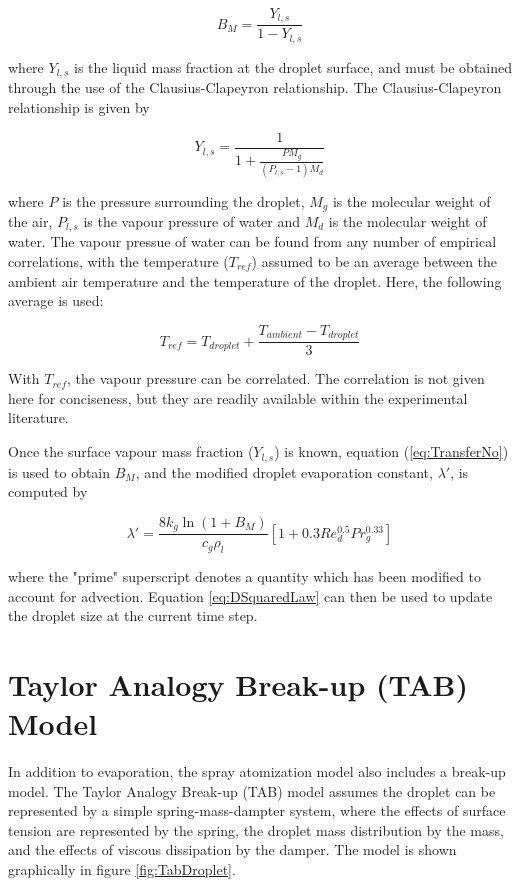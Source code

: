 \documentclass[12pt]{article}
\begin{document}
\begin{equation}\label{eq:TransferNo}
B_{M} = \frac{Y_{l, s}}{1 - Y_{l, s}}
\end{equation}

where $Y_{l, s}$ is the liquid mass fraction at the droplet surface, and must be obtained through the use of the Clausius-Clapeyron relationship. The Clausius-Clapeyron relationship is given by

\begin{equation}
Y_{l, s} = \frac{1}{1 + \frac{PM_{g}}{(P_{l, s} - 1)M_{d}}}
\end{equation}

where $P$ is the pressure surrounding the droplet, $M_{g}$ is the molecular weight of the air, $P_{l, s}$ is the vapour pressure of water and $M_{d}$ is the molecular weight of water. The vapour pressue of water can be found from any number of empirical correlations, with the temperature ($T_{ref}$) assumed to be an average between the ambient air temperature and the temperature of the droplet. Here, the following average is used:

\begin{equation}
T_{ref} = T_{droplet} + \frac{T_{ambient} - T_{droplet}}{3}
\end{equation}

With $T_{ref}$, the vapour pressure can be correlated. The correlation is not given here for conciseness, but they are readily available within the experimental literature.

Once the surface vapour mass fraction ($Y_{l, s}$) is known, equation (\ref{eq:TransferNo}) is used to obtain $B_{M}$, and the modified droplet evaporation constant, $\lambda'$, is computed by

\begin{equation}
\lambda' = \frac{8k_{g}\ln(1 + B_{M})}{c_{g}\rho_{l}}\left[1 + 0.3Re_{d}^{0.5}Pr_{g}^{0.33}\right]
\end{equation}

where the "prime" superscript denotes a quantity which has been modified to account for advection. Equation \ref{eq:DSquaredLaw} can then be used to update the droplet size at the current time step.

\section{Taylor Analogy Break-up (TAB) Model}\label{sec:TABModel}

In addition to evaporation, the spray atomization model also includes a break-up model. The Taylor Analogy Break-up (TAB) model assumes the droplet can be represented by a simple spring-mass-dampter system, where the effects of surface tension are represented by the spring, the droplet mass distribution by the mass, and the effects of viscous dissipation by the damper. The model is shown graphically in figure \ref{fig:TabDroplet}.
\end{document}
